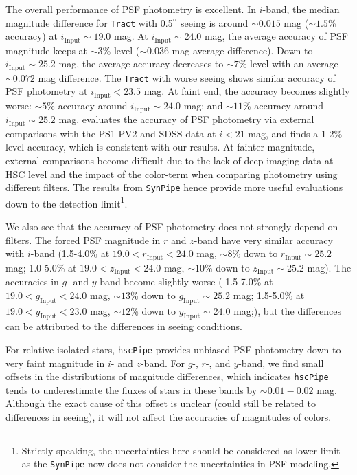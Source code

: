 \documentclass[useamsfonts]{pasj01}
\def\asec{$^{\prime\prime}$}
\def\hscpipe{\texttt{hscPipe}}
\def\synpipe{\texttt{SynPipe}}
\def\tract{\texttt{Tract}}
\begin{document}
    The overall performance of PSF photometry is excellent.
    In $i$-band, the median magnitude difference for \tract{} with 0.5\asec{} seeing is
    around ${\sim}0.015$ mag (${\sim}1.5$\% accuracy) at
    $i_{\mathrm{Input}}{\sim}19.0$ mag.
    At $i_{\mathrm{Input}}{\sim}24.0$ mag, the average accuracy of PSF
    magnitude keeps at ${\sim}3$\% level (${\sim}0.036$ mag average difference).
    Down to $i_{\mathrm{Input}}{\sim}25.2$ mag, the average accuracy decreases to
    ${\sim}7$\% level with an average ${\sim}0.072$ mag difference.
    The \tract{} with worse seeing shows similar accuracy of PSF photometry at
    $i_{\mathrm{Input}}<23.5$ mag.
    At faint end, the accuracy becomes slightly worse: ${\sim}5$\% accuracy around
    $i_{\mathrm{Input}}{\sim}24.0$ mag; and ${\sim}11$\% accuracy around
    $i_{\mathrm{Input}}{\sim}25.2$ mag.
    \citet{HSCDR1} evaluates the accuracy of PSF photometry via external comparisons
    with the PS1 PV2 and SDSS data at $i<21$ mag, and finds a 1-2\% level accuracy,
    which is consistent with our results.
    At fainter magnitude, external comparisons become difficult due to the lack of deep
    imaging data at HSC level and the impact of the color-term when comparing photometry
    using different filters.
    The results from \synpipe{} hence provide more useful evaluations down to the
    detection limit\footnote{Strictly speaking, the uncertainties here should be
    considered as lower limit as the \synpipe{} now does not consider the uncertainties
    in PSF modeling.}.

    We also see that the accuracy of PSF photometry does not strongly depend on filters.
    The forced PSF magnitude in $r$ and $z$-band have very similar accuracy with
    $i$-band (1.5-4.0\% at $19.0 < r_{\mathrm{Input}} < 24.0$ mag, ${\sim}8$\% down to
    $r_{\mathrm{Input}}{\sim}25.2$ mag;
    1.0-5.0\% at $19.0 < z_{\mathrm{Input}} < 24.0$ mag, ${\sim}10$\% down to
    $z_{\mathrm{Input}}{\sim}25.2$ mag).
    The accuracies in $g$- and $y$-band become slightly worse (
    1.5-7.0\% at $19.0 < g_{\mathrm{Input}} < 24.0$ mag, ${\sim}13$\% down to
    $g_{\mathrm{Input}}{\sim}25.2$ mag;
    1.5-5.0\% at $19.0 < y_{\mathrm{Input}} < 23.0$ mag, ${\sim}12$\% down to
    $y_{\mathrm{Input}}{\sim}24.0$ mag;), but the differences can be attributed to the
    differences in seeing conditions.

    For relative isolated stars, \hscpipe{} provides unbiased PSF photometry down to
    very faint magnitude in $i$- and $z$-band.
    For $g$-, $r$-, and $y$-band, we find small offsets in the distributions of magnitude
    differences, which indicates \hscpipe{} tends to underestimate the fluxes of stars
    in these bands by ${\sim}0.01-0.02$ mag.
    Although the exact cause of this offset is unclear (could still be related to
    differences in seeing), it will not affect the accuracies of magnitudes of colors.
\end{document}
